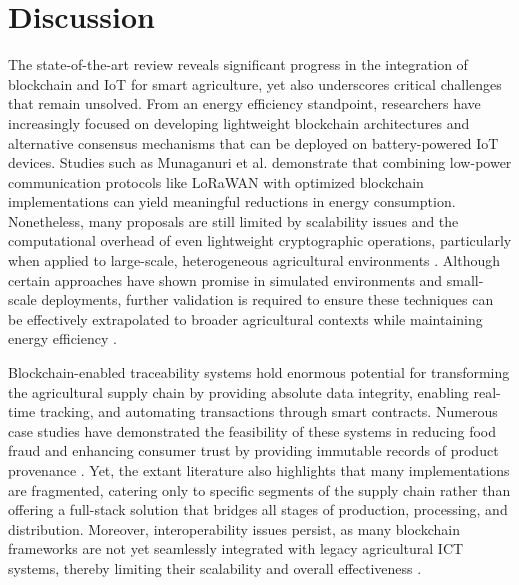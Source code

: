 \documentclass[12pt,onecolumn]{IEEEtran} %
\begin{document}
\section{Discussion}
The state-of-the-art review reveals significant progress in the integration of blockchain and IoT for smart agriculture, yet also underscores critical challenges that remain unsolved. From an energy efficiency standpoint, researchers have increasingly focused on developing lightweight blockchain architectures and alternative consensus mechanisms that can be deployed on battery-powered IoT devices. Studies such as Munaganuri et al. \cite{munaganuri2025designofan} demonstrate that combining low-power communication protocols like LoRaWAN with optimized blockchain implementations can yield meaningful reductions in energy consumption. Nonetheless, many proposals are still limited by scalability issues and the computational overhead of even lightweight cryptographic operations, particularly when applied to large-scale, heterogeneous agricultural environments \cite{akella2023asystematicreview, munaganuri2025designofan}. Although certain approaches have shown promise in simulated environments and small-scale deployments, further validation is required to ensure these techniques can be effectively extrapolated to broader agricultural contexts while maintaining energy efficiency \cite{tahayur2024enhancingelectronicagriculture, mwewa2024blockchaintechnologya}.



Blockchain-enabled traceability systems hold enormous potential for transforming the agricultural supply chain by providing absolute data integrity, enabling real-time tracking, and automating transactions through smart contracts. Numerous case studies have demonstrated the feasibility of these systems in reducing food fraud and enhancing consumer trust by providing immutable records of product provenance \cite{akella2023asystematicreview, mwewa2024blockchaintechnologya}. Yet, the extant literature also highlights that many implementations are fragmented, catering only to specific segments of the supply chain rather than offering a full-stack solution that bridges all stages of production, processing, and distribution. Moreover, interoperability issues persist, as many blockchain frameworks are not yet seamlessly integrated with legacy agricultural ICT systems, thereby limiting their scalability and overall effectiveness \cite{akella2023asystematicreview}.



\end{document}
